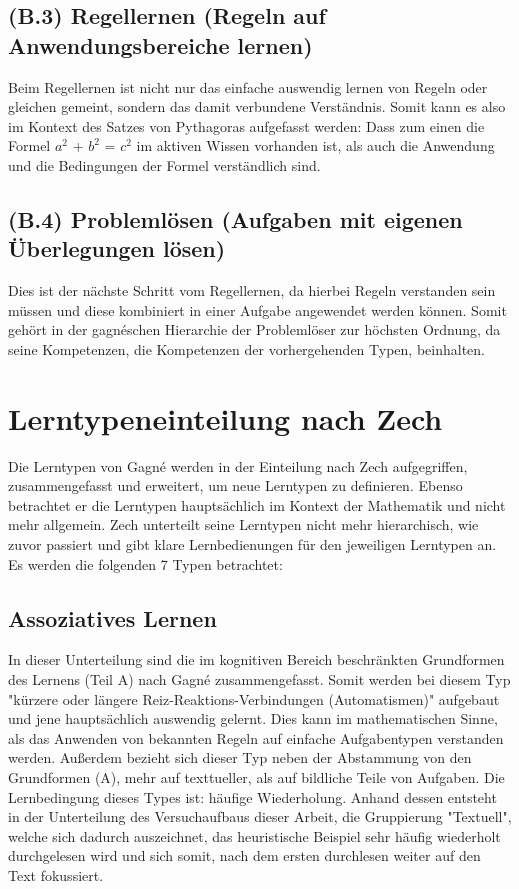 \subsection[]{(B.3) Regellernen (Regeln auf Anwendungsbereiche lernen)}

Beim Regellernen ist nicht nur das einfache auswendig lernen von Regeln oder gleichen gemeint, sondern das damit verbundene Verständnis. Somit kann es also im Kontext des Satzes von Pythagoras aufgefasst werden: Dass zum einen die Formel $a^2$ + $b^2$ = $c^2$ im aktiven Wissen vorhanden ist, als auch die Anwendung und die Bedingungen der Formel verständlich sind.

\subsection[]{(B.4) Problemlösen (Aufgaben mit eigenen Überlegungen lösen)}

Dies ist der nächste Schritt vom Regellernen, da hierbei Regeln verstanden sein müssen und diese kombiniert in einer Aufgabe angewendet werden können. Somit gehört in der gagnéschen Hierarchie der Problemlöser zur höchsten Ordnung, da seine Kompetenzen, die Kompetenzen der vorhergehenden Typen, beinhalten.

\section{Lerntypeneinteilung nach Zech}

Die Lerntypen von Gagné werden in der Einteilung nach Zech aufgegriffen, zusammengefasst und erweitert, um neue Lerntypen zu definieren. Ebenso betrachtet er die Lerntypen hauptsächlich im Kontext der Mathematik und nicht mehr allgemein. Zech unterteilt seine Lerntypen nicht mehr hierarchisch, wie zuvor passiert und gibt klare Lernbedienungen für den jeweiligen Lerntypen an. Es werden die folgenden 7 Typen betrachtet:

\subsection[]{Assoziatives Lernen}

In dieser Unterteilung sind die im kognitiven Bereich beschränkten Grundformen des Lernens (Teil A) nach Gagné zusammengefasst. Somit werden bei diesem Typ "kürzere oder längere Reiz-Reaktions-Verbindungen (Automatismen)" aufgebaut und jene hauptsächlich auswendig gelernt. Dies kann im mathematischen Sinne, als das Anwenden von bekannten Regeln auf einfache Aufgabentypen verstanden werden. Außerdem bezieht sich dieser Typ neben der Abstammung von den Grundformen (A), mehr auf texttueller, als auf bildliche Teile von Aufgaben.
Die Lernbedingung dieses Types ist: häufige Wiederholung. 
Anhand dessen entsteht in der Unterteilung des Versuchaufbaus dieser Arbeit, die Gruppierung "Textuell", welche sich dadurch auszeichnet, das heuristische Beispiel sehr häufig wiederholt durchgelesen wird und sich somit, nach dem ersten durchlesen weiter auf den Text fokussiert. 


